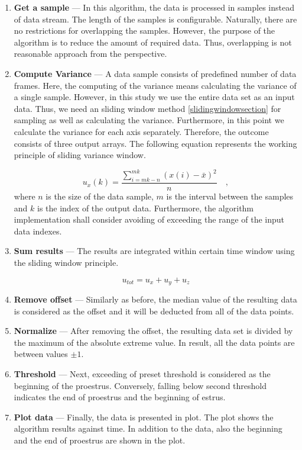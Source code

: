 \documentclass[english,12pt,a4paper,pdftex,elec,utf8]{aaltothesis}
\begin{document}
\begin{enumerate}

\item \textbf{Get a sample} --- In this algorithm, the data is processed in samples instead of data stream. The length of the samples is configurable. Naturally, there are no restrictions for overlapping the samples. However, the purpose of the algorithm is to reduce the amount of required data. Thus, overlapping is not reasonable approach from the perspective.

\item \textbf{Compute Variance} --- A data sample consists of predefined number of data frames. Here, the computing of the variance means calculating the variance of a single sample. However, in this study we use the entire data set as an input data. Thus, we need an sliding window method \ref{slidingwindowsection} for sampling as well as calculating the variance. Furthermore, in this point we calculate the variance for each axis separately. Therefore, the outcome consists of three output arrays. The following equation represents the working principle of sliding variance window.

\begin{equation} \label{samplevariance}
u_x(k) = \frac{\sum \limits_{i=mk-n}^{mk} (x(i) - \bar{x})^2}{n} \mathrm{\hspace{1em},}
\end{equation}
where $n$ is the size of the data sample, $m$ is the interval between the samples and $k$ is the index of the output data. Furthermore, the algorithm implementation shall consider avoiding of exceeding the range of the input data indexes.

\item \textbf{Sum results} --- The results are integrated within certain time window using the sliding window principle.

\begin{equation}
u_{tot} = u_x + u_y + u_z
\end{equation}

\item \textbf{Remove offset} --- Similarly as before, the median value of the resulting data is considered as the offset and it will be deducted from all of the data points.

\item \textbf{Normalize} --- After removing the offset, the resulting data set is divided by the maximum of the absolute extreme value. In result, all the data points are between values $\pm 1$.

\item \textbf{Threshold} --- Next, exceeding of preset threshold is considered as the beginning of the proestrus. Conversely, falling below second threshold indicates the end of proestrus and the beginning of estrus.

\item \textbf{Plot data} --- Finally, the data is presented in plot. The plot shows the algorithm results against time. In addition to the data, also the beginning and the end of proestrus are shown in the plot.

\end{enumerate}
\end{document}
